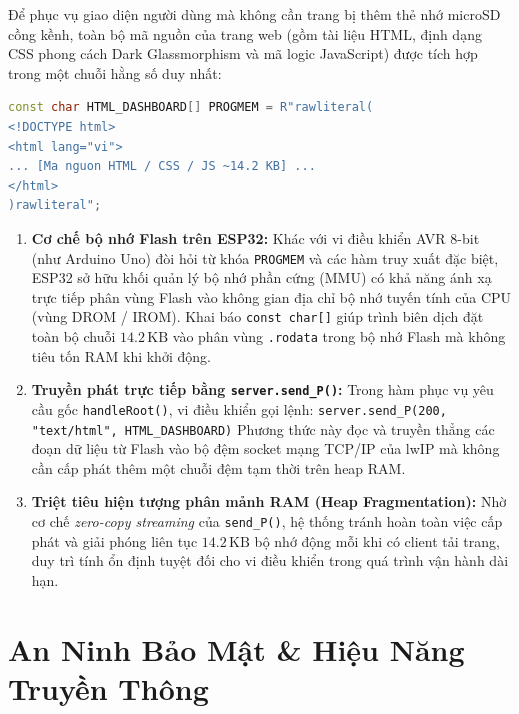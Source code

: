 Để phục vụ giao diện người dùng mà không cần trang bị thêm thẻ nhớ microSD cồng kềnh, toàn bộ mã nguồn của trang web (gồm tài liệu HTML, định dạng CSS phong cách Dark Glassmorphism và mã logic JavaScript) được tích hợp trong một chuỗi hằng số duy nhất:
\begin{lstlisting}[language=C++]
const char HTML_DASHBOARD[] PROGMEM = R"rawliteral(
<!DOCTYPE html>
<html lang="vi">
... [Ma nguon HTML / CSS / JS ~14.2 KB] ...
</html>
)rawliteral";
\end{lstlisting}
\begin{enumerate}
    \item \textbf{Cơ chế bộ nhớ Flash trên ESP32:} Khác với vi điều khiển AVR 8-bit (như Arduino Uno) đòi hỏi từ khóa \texttt{PROGMEM} và các hàm truy xuất đặc biệt, ESP32 sở hữu khối quản lý bộ nhớ phần cứng (MMU) có khả năng ánh xạ trực tiếp phân vùng Flash vào không gian địa chỉ bộ nhớ tuyến tính của CPU (vùng DROM / IROM). Khai báo \texttt{const char[]} giúp trình biên dịch đặt toàn bộ chuỗi $14.2\,\text{KB}$ vào phân vùng \texttt{.rodata} trong bộ nhớ Flash mà không tiêu tốn RAM khi khởi động.
    \item \textbf{Truyền phát trực tiếp bằng \texttt{server.send\_P()}:} Trong hàm phục vụ yêu cầu gốc \texttt{handleRoot()}, vi điều khiển gọi lệnh:
    \newline
    \texttt{server.send\_P(200, "text/html", HTML\_DASHBOARD)}
    \newline
    Phương thức này đọc và truyền thẳng các đoạn dữ liệu từ Flash vào bộ đệm socket mạng TCP/IP của lwIP mà không cần cấp phát thêm một chuỗi đệm tạm thời trên heap RAM.
    \item \textbf{Triệt tiêu hiện tượng phân mảnh RAM (Heap Fragmentation):} Nhờ cơ chế \textit{zero-copy streaming} của \texttt{send\_P()}, hệ thống tránh hoàn toàn việc cấp phát và giải phóng liên tục $14.2\,\text{KB}$ bộ nhớ động mỗi khi có client tải trang, duy trì tính ổn định tuyệt đối cho vi điều khiển trong quá trình vận hành dài hạn.
\end{enumerate}

\section{An Ninh Bảo Mật \& Hiệu Năng Truyền Thông}

